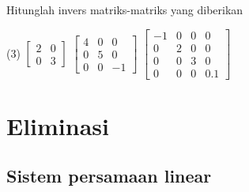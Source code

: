 \begin{exercise}
Hitunglah invers matriks-matriks yang diberikan
\begin{tasks}(3)
\task
$\begin{bmatrix}
2 & 0 \\
0 & 3
\end{bmatrix}$
\task
$\begin{bmatrix}
4 & 0 & 0 \\
0 & 5 & 0 \\
0 & 0 & -1
\end{bmatrix}$
\task
$\begin{bmatrix}
-1 & 0 & 0 & 0 \\
0 & 2 & 0 & 0 \\
0 & 0 & 3 & 0 \\
0 & 0 & 0 & 0.1
\end{bmatrix}$
\end{tasks}
\end{exercise}




\sectionnewpage
\section{Eliminasi}
\label{elim:section}



\subsection{Sistem persamaan linear}

